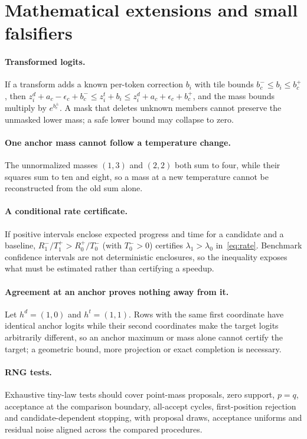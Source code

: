 \section{Mathematical extensions and small falsifiers}\label{app:math}
\paragraph{Transformed logits.} If a transform adds a known per-token correction $b_i$ with tile bounds $b_c^-\le b_i\le b_c^+$, then $z_i^d+a_c-\epsilon_c+b_c^-\le z_i^t+b_i\le z_i^d+a_c+\epsilon_c+b_c^+$, and the mass bounds multiply by $e^{b_c^\pm}$. A mask that deletes unknown members cannot preserve the unmasked lower mass; a safe lower bound may collapse to zero.

\paragraph{One anchor mass cannot follow a temperature change.} The unnormalized masses $(1,3)$ and $(2,2)$ both sum to four, while their squares sum to ten and eight, so a mass at a new temperature cannot be reconstructed from the old sum alone.

\paragraph{A conditional rate certificate.} If positive intervals enclose expected progress and time for a candidate and a baseline, $R_1^-/T_1^+>R_0^+/T_0^-$ (with $T_0^->0$) certifies $\lambda_1>\lambda_0$ in~\eqref{eq:rate}. Benchmark confidence intervals are not deterministic enclosures, so the inequality exposes what must be estimated rather than certifying a speedup.

\paragraph{Agreement at an anchor proves nothing away from it.} Let $h^d=(1,0)$ and $h^t=(1,1)$. Rows with the same first coordinate have identical anchor logits while their second coordinates make the target logits arbitrarily different, so an anchor maximum or mass alone cannot certify the target; a geometric bound, more projection or exact completion is necessary.

\paragraph{RNG tests.} Exhaustive tiny-law tests should cover point-mass proposals, zero support, $p=q$, acceptance at the comparison boundary, all-accept cycles, first-position rejection and candidate-dependent stopping, with proposal draws, acceptance uniforms and residual noise aligned across the compared procedures.

